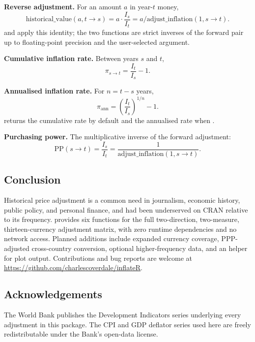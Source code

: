 \textbf{Reverse adjustment.} For an amount \(a\) in year-\(t\) money,
\[\mathrm{historical\_value}(a, t \to s) = a \cdot \frac{I_s}{I_t}
  = a / \mathrm{adjust\_inflation}(1, s \to t).\]
 and  apply this
identity; the two functions are strict inverses of the forward pair up
to floating-point precision and the user-selected  argument.

\textbf{Cumulative inflation rate.} Between years \(s\) and \(t\),
\[\pi_{s \to t} = \frac{I_t}{I_s} - 1.\]

\textbf{Annualised inflation rate.} For \(n = t - s\) years,
\[\pi_{\mathrm{ann}} = \left(\frac{I_t}{I_s}\right)^{1/n} - 1.\]
 returns the cumulative rate by default and the
annualised rate when .

\textbf{Purchasing power.} The multiplicative inverse of the forward
adjustment: \[\mathrm{PP}(s \to t) = \frac{I_s}{I_t}
  = \frac{1}{\mathrm{adjust\_inflation}(1, s \to t)}.\]

\subsection{Conclusion}\label{conclusion}

Historical price adjustment is a common need in journalism, economic
history, public policy, and personal finance, and had been underserved
on CRAN relative to its frequency.  provides six
functions for the full two-direction, two-measure, thirteen-currency
adjustment matrix, with zero runtime dependencies and no network access.
Planned additions include expanded currency coverage, PPP-adjusted
cross-country conversion, optional higher-frequency data, and an
 helper for plot output. Contributions and bug
reports are welcome at
\url{https://github.com/charlescoverdale/inflateR}.

\subsection*{Acknowledgements}\label{acknowledgements}

The World Bank publishes the Development Indicators series underlying
every adjustment in this package. The CPI and GDP deflator series used
here are freely redistributable under the Bank's open-data license.



\address{%
Charles Coverdale\\
London, United Kingdom\\%
United Kingdom\\
%
\url{https://github.com/charlescoverdale/inflateR}\\%
%
\href{mailto:charles.f.coverdale@gmail.com}{\nolinkurl{charles.f.coverdale@gmail.com}}%
}
